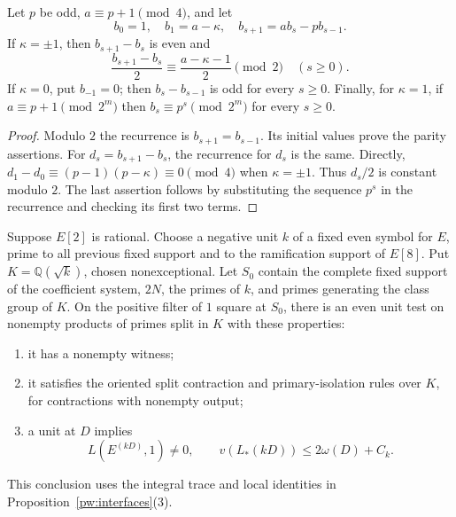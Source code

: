 \begin{lemma}\label{pw:recurrence}
Let $p$ be odd, $a\equiv p+1\pmod4$, and let
\[
 b_0=1,\quad b_1=a-\kappa,\quad
 b_{s+1}=ab_s-pb_{s-1}.
\]
If $\kappa=\pm1$, then $b_{s+1}-b_s$ is even and
\[
 \frac{b_{s+1}-b_s}{2}\equiv\frac{a-\kappa-1}{2}\pmod2
 \quad(s\ge0).
\]
If $\kappa=0$, put $b_{-1}=0$; then $b_s-b_{s-1}$ is odd for every
$s\ge0$.  Finally, for $\kappa=1$, if $a\equiv p+1\pmod{2^m}$ then
$b_s\equiv p^s\pmod{2^m}$ for every $s\ge0$.
\end{lemma}

\begin{proof}
Modulo $2$ the recurrence is $b_{s+1}=b_{s-1}$.  Its initial values prove
the parity assertions.  For $d_s=b_{s+1}-b_s$, the recurrence for $d_s$
is the same.  Directly,
$d_1-d_0\equiv(p-1)(p-\kappa)\equiv0\pmod4$ when $\kappa=\pm1$.
Thus $d_s/2$ is constant modulo $2$.  The last assertion follows by
substituting the sequence $p^s$ in the recurrence and checking its first
two terms.
\end{proof}

\begin{lemma}\label{pw:split-witness}
Suppose $E[2]$ is rational.  Choose a negative unit $k$ of a fixed even
symbol for $E$, prime to all previous fixed support and to the ramification
support of $E[8]$.  Put $K=\mathbb Q(\sqrt{k})$, chosen nonexceptional.
Let $S_0$ contain the complete fixed support of the coefficient system,
$2N$, the primes of $k$, and primes generating the class group of $K$.
On the positive filter of $1$ square at $S_0$, there is an
even unit test on nonempty products of primes split in $K$ with these
properties:
\begin{enumerate}
\item it has a nonempty witness;
\item it satisfies the oriented split contraction and primary-isolation
rules over $K$, for contractions with nonempty output;
\item a unit at $D$ implies
\begin{equation}\label{pw:split-unit-bound}
 L(E^{(kD)},1)\ne0,\qquad v(L_*(kD))\le 2\omega(D)+C_k.
\end{equation}
\end{enumerate}
This conclusion uses the integral trace and local identities in
Proposition~\ref{pw:interfaces}(3).
\end{lemma}

